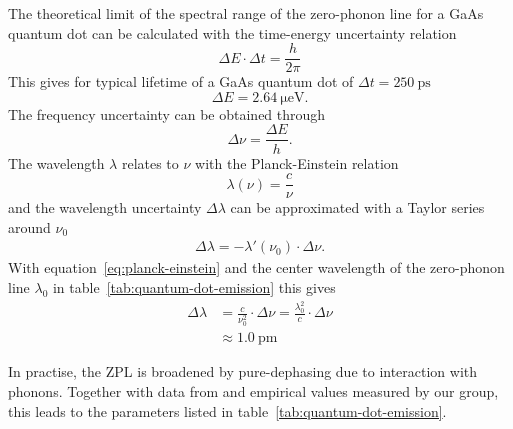 \newpage

The theoretical limit of the spectral range of the zero-phonon line for a GaAs quantum dot can be calculated with the time-energy uncertainty relation
\begin{equation}
\Delta E \cdot \Delta t = \frac{h}{2 \pi}
\end{equation}
This gives for typical lifetime of a GaAs quantum dot of $\Delta t = \SI{250}{\pico \second}$
\begin{equation}
\Delta E = \SI{2.64}{\micro \electronvolt}.
\end{equation}
The frequency uncertainty can be obtained through
\begin{equation}
\label{eq:planck-einstein}
\Delta \nu = \frac{\Delta E}{h}.
\end{equation}
The wavelength $\lambda$ relates to $\nu$ with the Planck-Einstein relation
\begin{equation}
\lambda(\nu) = \frac{c}{\nu}
\end{equation}
and the wavelength uncertainty $\Delta \lambda$ can be approximated with a Taylor series around $\nu_0$
\begin{align}
\Delta \lambda = - \lambda'(\nu_0)\cdot \Delta \nu.
\end{align}
With equation~\eqref{eq:planck-einstein} and the center wavelength of the zero-phonon line $\lambda_{0}$ in table~\ref{tab:quantum-dot-emission} this gives
\begin{align}
\Delta \lambda &= \frac{c}{\nu_0^2} \cdot \Delta \nu = \frac{\lambda_0^2}{c}\cdot\Delta \nu\\
\label{eq:zero-phonon-theoretical-limit}
&\approx \SI{1.0}{\pico \metre}
\end{align}

In practise, the \ac{ZPL} is broadened by pure-dephasing due to interaction with phonons. 
Together with data from \textcite{scholl_resonance_2019} and empirical values measured by our group, this leads to the parameters listed in table~\ref{tab:quantum-dot-emission}.

